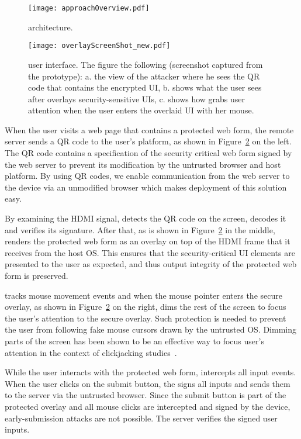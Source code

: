 \begin{figure}[t]
	\centering
	\texttt{[image: approachOverview.pdf]}
	\caption{\protection architecture.}
	\label{fig:architecture}
\end{figure}

\begin{figure}[t]
	\centering
	\texttt{[image: overlayScreenShot\_new.pdf]}
	\caption{\protection user interface. The figure the following (screenshot captured from the \protection prototype): a. the view of the attacker where he sees the QR code that contains the encrypted UI, b. shows what the user sees after \hub overlays security-sensitive UIs, c. shows how \protection grabs user attention when the user enters the overlaid UI with her mouse.}
	\label{fig:screenshot}
\end{figure}

When the user visits a web page that contains a protected web form, the remote server sends a QR code to the user's platform, as shown in Figure~\ref{fig:screenshot} on the left. The QR code contains a specification of the security critical web form signed by the web server to prevent its modification by the untrusted browser and host platform. By using QR codes, we enable communication from the web server to the \hub device via an unmodified browser which makes deployment of this solution easy.

By examining the HDMI signal, \hub detects the QR code on the screen, decodes it and verifies its signature. After that, as is shown in Figure~\ref{fig:screenshot} in the middle, \hub renders the protected web form as an overlay on top of the HDMI frame that it receives from the host OS. This ensures that the security-critical UI elements are presented to the user as expected, and thus output integrity of the protected web form is preserved.

\hub tracks mouse movement events and when the mouse pointer enters the secure overlay, as shown in Figure~\ref{fig:screenshot} on the right, \hub dims the rest of the screen to focus the user's attention to the secure overlay. Such protection is needed to prevent the user from following fake mouse cursors drawn by the untrusted OS. Dimming parts of the screen has been shown to be an effective way to focus user's attention in the context of clickjacking studies~\cite{huang2012clickjacking}.

While the user interacts with the protected web form, \hub intercepts all input events. When the user clicks on the submit button, the \hub signs all inputs and sends them to the server via the untrusted browser. Since the submit button is part of the protected overlay and all mouse clicks are intercepted and signed by the \hub device, early-submission attacks are not possible. The server verifies the signed user inputs. 

